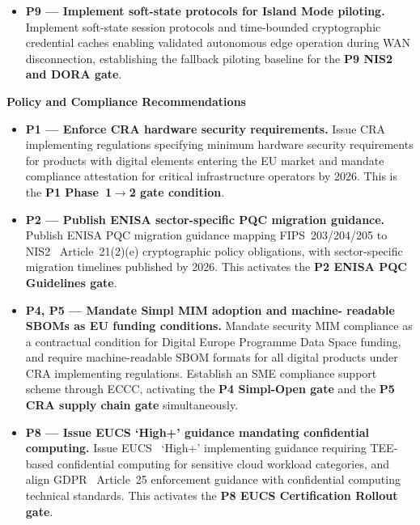 \begin{itemize}
    \item \textbf{P9 --- Implement soft-state protocols for Island
    Mode piloting.}
    Implement soft-state session protocols and time-bounded
    cryptographic credential caches enabling validated autonomous edge
    operation during WAN disconnection, establishing the fallback
    piloting baseline for the \textbf{P9 NIS2 and DORA gate}.

\end{itemize}

\textbf{Policy and Compliance Recommendations}

\begin{itemize}

    \item \textbf{P1 --- Enforce CRA hardware security requirements.}
    Issue CRA~\cite{cra} implementing regulations specifying minimum
    hardware security requirements for products with digital elements
    entering the EU market and mandate compliance attestation for
    critical infrastructure operators by 2026. This is the
    \textbf{P1 Phase~1$\to$2 gate condition}.

    \item \textbf{P2 --- Publish ENISA sector-specific PQC migration
    guidance.}
    Publish ENISA PQC migration guidance mapping FIPS~203/204/205 to
    NIS2~\cite{nis2} Article~21(2)(e) cryptographic policy obligations,
    with sector-specific migration timelines published by 2026.
    This activates the \textbf{P2 ENISA PQC Guidelines gate}.

    \item \textbf{P4, P5 --- Mandate Simpl MIM adoption and machine-
    readable SBOMs as EU funding conditions.}
    Mandate security MIM compliance as a contractual condition for
    Digital Europe Programme Data Space funding, and require
    machine-readable SBOM formats for all digital products under CRA
    implementing regulations. Establish an SME compliance support
    scheme through ECCC, activating the \textbf{P4 Simpl-Open gate}
    and the \textbf{P5 CRA supply chain gate} simultaneously.

    \item \textbf{P8 --- Issue EUCS `High+' guidance mandating
    confidential computing.}
    Issue EUCS~\cite{eucs} `High+' implementing guidance requiring
    TEE-based confidential computing for sensitive cloud workload
    categories, and align GDPR~\cite{gdpr} Article~25 enforcement
    guidance with confidential computing technical standards.
    This activates the \textbf{P8 EUCS Certification Rollout gate}.


\end{itemize}

